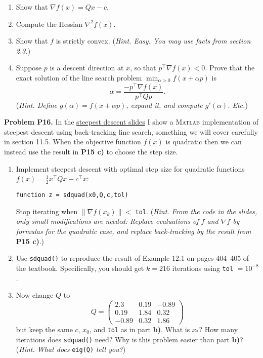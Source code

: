 \documentclass[12pt]{amsart}
\newcommand{\grad}{\nabla}
\newcommand{\Matlab}{\textsc{Matlab}\xspace}
\newcommand{\prob}[1]{\bigskip\noindent\textbf{#1}\quad }
\begin{document}
\medskip
\renewcommand{\labelenumi}{\textbf{\alph{enumi})}}
\begin{enumerate}
\item Show that $\grad f(x) = Q x - c$.
\item Compute the Hessian $\grad^2 f(x)$.
\item Show that $f$ is strictly convex.  (\emph{Hint.  Easy.  You may use facts from section 2.3.})
\item Suppose $p$ is a descent direction at $x$, so that $p^\top \grad f(x)<0$.  Prove that the exact solution of the line search problem $\min_{\alpha>0} f(x+\alpha p)$ is
    $$\alpha = \frac{-p^\top \grad f(x)}{p^\top Q p}.$$
(\emph{Hint.  Define $g(\alpha)=f(x+\alpha p)$, expand it, and compute $g'(\alpha)$. Etc.})
\end{enumerate}


\prob{Problem P16.}  In the \href{https://bueler.github.io/opt/assets/slides/F24/sdneedshelp.pdf}{steepest descent slides} I show a \Matlab implementation of steepest descent using back-tracking line search, something we will cover carefully in section 11.5.  When the objective function $f(x)$ is quadratic then we can instead use the result in \textbf{P15 c)} to choose the step size.
\begin{enumerate}
\item Implement steepest descent with optimal step size for quadratic functions $f(x) = \frac{1}{2} x^\top Q x - c^\top x$:

\centerline{\texttt{function z = sdquad(x0,Q,c,tol)}}

\noindent Stop iterating when $\|\grad f(x_k)\| < $ \texttt{tol}.  (\emph{Hint.  From the code in the slides, only small modifications are needed:  Replace evaluations of $f$ and $\grad f$ by formulas for the quadratic case, and replace back-tracking by the result from }\textbf{P15 c)}.)
\item Use \texttt{sdquad()} to reproduce the result of Example 12.1 on pages 404--405 of the textbook.  Specifically, you should get $k=216$ iterations using \texttt{tol} $=10^{-8}$.
\item Now change $Q$ to
    $$Q = \begin{pmatrix}
    2.3   &  0.19 & -0.89 \\
    0.19  &  1.84 &  0.32 \\
    -0.89 &  0.32 &  1.86
    \end{pmatrix}$$
but keep the same $c$, $x_0$, and \texttt{tol} as in part \textbf{b)}.  What is $x_*$?  How many iterations does \texttt{sdquad()} need?  Why is this problem easier than part \textbf{b)}?  (\emph{Hint.  What does} \texttt{eig(Q)} \emph{tell you?})
\end{enumerate}
\end{document}
